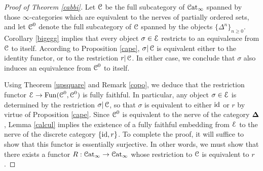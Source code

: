 \begin{proof}[Proof of Theorem \ref{cabbi}]
Let $\operatorname{\mathcal{C}}$ be the full subcategory of $\operatorname{\mathcal{C}at}_{\infty}$ spanned by those $\infty$-categories
which are equivalent to the nerves of partially ordered sets, and let $\operatorname{\mathcal{C}}^{0}$ denote the full subcategory of $\operatorname{\mathcal{C}}$ spanned by the objects $\{ \Delta^n \}_{n \geq 0}$. 
Corollary \ref{bigegg} implies that every object $\sigma \in \operatorname{\mathcal{E}}$ restricts to an equivalence from $\operatorname{\mathcal{C}}$ to itself. According to Proposition \ref{cape}, $\sigma| \operatorname{\mathcal{C}}$ is equivalent either to the identity functor, or to the restriction $r|\operatorname{\mathcal{C}}$. In either case, we conclude that $\sigma$ also induces an equivalence from $\operatorname{\mathcal{C}}^{0}$ to itself.

Using Theorem \ref{upsquare} and Remark \ref{copo}, we deduce that the restriction functor
$\operatorname{\mathcal{E}} \rightarrow \operatorname{Fun}(\operatorname{\mathcal{C}}^{0}, \operatorname{\mathcal{C}}^{0})$ is fully faithful. In particular, any object $\sigma \in \operatorname{\mathcal{E}}$ is determined by the restriction $\sigma | \operatorname{\mathcal{C}}$, so that $\sigma$ is equivalent to either $\operatorname{id}$ or
$r$ by virtue of Proposition \ref{cape}. Since $\operatorname{\mathcal{C}}^{0}$ is equivalent to the nerve of the category
$\operatorname{{\bf \Delta}}$, Lemma \ref{calcul} implies the existence of a fully faithful embedding from
$\operatorname{\mathcal{E}}$ to the nerve of the discrete category $\{ \operatorname{id}, r \}$. To complete the proof, it will suffice to show that this functor is essentially surjective. In other words, we must show that there exists a functor
$R: \operatorname{\mathcal{C}at}_{\infty} \rightarrow \operatorname{\mathcal{C}at}_{\infty}$ whose restriction to $\operatorname{\mathcal{C}}$ is equivalent to $r$. 


\end{proof}
